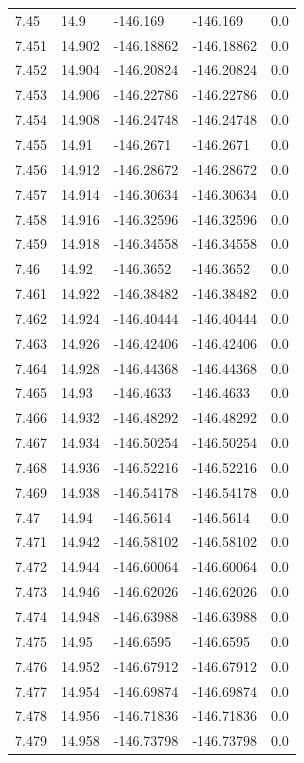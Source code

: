 \begin{tabular}{lllll}
7.45 & 14.9 & -146.169 & -146.169 & 0.0 \\
7.451 & 14.902 & -146.18862 & -146.18862 & 0.0 \\
7.452 & 14.904 & -146.20824 & -146.20824 & 0.0 \\
7.453 & 14.906 & -146.22786 & -146.22786 & 0.0 \\
7.454 & 14.908 & -146.24748 & -146.24748 & 0.0 \\
7.455 & 14.91 & -146.2671 & -146.2671 & 0.0 \\
7.456 & 14.912 & -146.28672 & -146.28672 & 0.0 \\
7.457 & 14.914 & -146.30634 & -146.30634 & 0.0 \\
7.458 & 14.916 & -146.32596 & -146.32596 & 0.0 \\
7.459 & 14.918 & -146.34558 & -146.34558 & 0.0 \\
7.46 & 14.92 & -146.3652 & -146.3652 & 0.0 \\
7.461 & 14.922 & -146.38482 & -146.38482 & 0.0 \\
7.462 & 14.924 & -146.40444 & -146.40444 & 0.0 \\
7.463 & 14.926 & -146.42406 & -146.42406 & 0.0 \\
7.464 & 14.928 & -146.44368 & -146.44368 & 0.0 \\
7.465 & 14.93 & -146.4633 & -146.4633 & 0.0 \\
7.466 & 14.932 & -146.48292 & -146.48292 & 0.0 \\
7.467 & 14.934 & -146.50254 & -146.50254 & 0.0 \\
7.468 & 14.936 & -146.52216 & -146.52216 & 0.0 \\
7.469 & 14.938 & -146.54178 & -146.54178 & 0.0 \\
7.47 & 14.94 & -146.5614 & -146.5614 & 0.0 \\
7.471 & 14.942 & -146.58102 & -146.58102 & 0.0 \\
7.472 & 14.944 & -146.60064 & -146.60064 & 0.0 \\
7.473 & 14.946 & -146.62026 & -146.62026 & 0.0 \\
7.474 & 14.948 & -146.63988 & -146.63988 & 0.0 \\
7.475 & 14.95 & -146.6595 & -146.6595 & 0.0 \\
7.476 & 14.952 & -146.67912 & -146.67912 & 0.0 \\
7.477 & 14.954 & -146.69874 & -146.69874 & 0.0 \\
7.478 & 14.956 & -146.71836 & -146.71836 & 0.0 \\
7.479 & 14.958 & -146.73798 & -146.73798 & 0.0 \\

\end{tabular}
